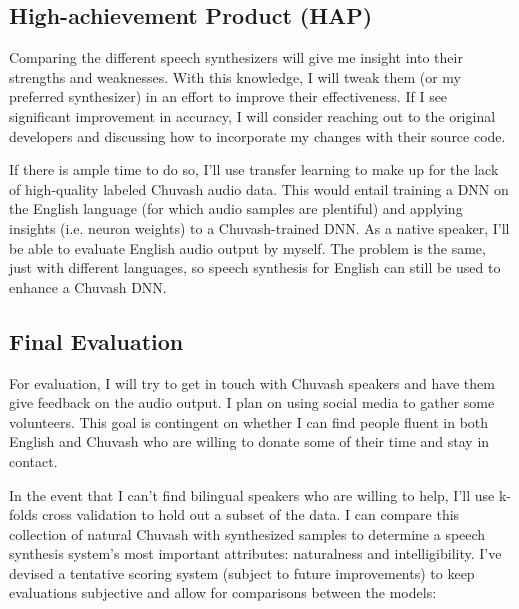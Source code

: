 \documentclass[fleqn,10pt]{SelfArx} %
\begin{document}
	\subsection{High-achievement Product (HAP)}
	Comparing the different speech synthesizers will give me insight into their strengths and weaknesses. With this knowledge, I will tweak them (or my preferred synthesizer) in an effort to improve their effectiveness. If I see significant improvement in accuracy, I will consider reaching out to the original developers and discussing how to incorporate my changes with their source code.
	
	If there is ample time to do so, I'll use transfer learning to make up for the lack of high-quality labeled Chuvash audio data. This would entail training a DNN on the English language (for which audio samples are plentiful) and applying insights (i.e. neuron weights) to a Chuvash-trained DNN\cite{tdsTransferLearning}. As a native speaker, I'll be able to evaluate English audio output by myself. The problem is the same, just with different languages, so speech synthesis for English can still be used to enhance a Chuvash DNN.
	
	\subsection{Final Evaluation}
	For evaluation, I will try to get in touch with Chuvash speakers and have them give feedback on the audio output. I plan on using social media to gather some volunteers. This goal is contingent on whether I can find people fluent in both English and Chuvash who are willing to donate some of their time and stay in contact.
	
	In the event that I can't find bilingual speakers who are willing to help, I'll use k-folds cross validation to hold out a subset of the data. I can compare this collection of natural Chuvash with synthesized samples to determine a speech synthesis system's most important attributes: naturalness and intelligibility\cite{taylorTTS}. I've devised a tentative scoring system (subject to future improvements) to keep evaluations subjective and allow for comparisons between the models:
	
\end{document}
